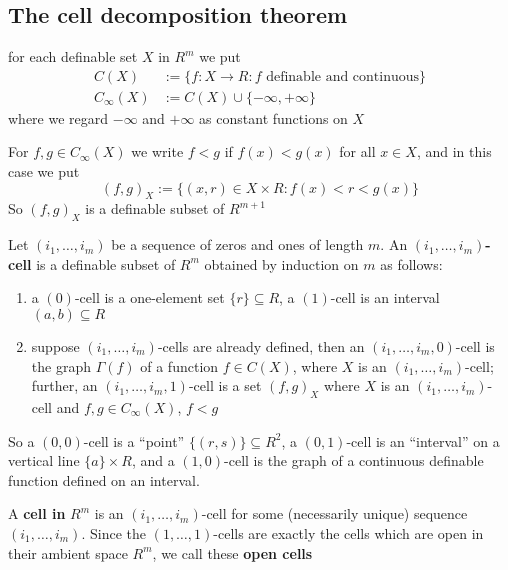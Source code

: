 \documentclass[11pt]{article}
\begin{document}
\subsection{The cell decomposition theorem}
\label{sec:org87b961d}
for each definable set \(X\) in \(R^m\) we put
\begin{align*}
C(X)&:=\{f:X\to R:f\text{ definable and continuous}\}\\
C_\infty(X)&:=C(X)\cup\{-\infty,+\infty\}
\end{align*}
where we regard \(-\infty\) and \(+\infty\) as constant functions on \(X\)

For \(f,g\in C_\infty(X)\) we write \(f<g\) if \(f(x)<g(x)\) for all \(x\in X\), and in this case we put
\begin{equation*}
(f,g)_X:=\{(x,r)\in X\times R:f(x)<r<g(x)\}
\end{equation*}
So \((f,g)_X\) is a definable subset of \(R^{m+1}\)

\begin{definition}[]
Let \((i_1,\dots,i_m)\) be a sequence of zeros and ones of length \(m\). An \textbf{\((i_1,\dots,i_m)\)-cell} is a
definable subset of \(R^m\) obtained by induction on \(m\) as follows:
\begin{enumerate}
\item a \((0)\)-cell is a one-element set \(\{r\}\subseteq R\), a \((1)\)-cell is an
interval \((a,b)\subseteq R\)
\item suppose \((i_1,\dots,i_m)\)-cells are already defined, then an \((i_1,\dots,i_m,0)\)-cell is the
graph \(\Gamma(f)\) of a function \(f\in C(X)\), where \(X\) is an \((i_1,\dots,i_m)\)-cell; further,
an \((i_1,\dots,i_m,1)\)-cell is a set \((f,g)_X\) where \(X\) is an \((i_1,\dots,i_m)\)-cell
and \(f,g\in C_\infty(X)\), \(f<g\)
\end{enumerate}
\end{definition}

So a \((0,0)\)-cell is a ``point'' \(\{(r,s)\}\subseteq R^2\), a \((0,1)\)-cell is an ``interval'' on a
vertical line \(\{a\}\times R\), and a \((1,0)\)-cell is the graph of a continuous definable function
defined on an interval.

\begin{definition}[]
A \textbf{cell in} \(R^m\) is an \((i_1,\dots,i_m)\)-cell for some (necessarily unique)
sequence \((i_1,\dots,i_m)\). Since the \((1,\dots,1)\)-cells are exactly the cells which are open in
their ambient space \(R^m\), we call these \textbf{open cells}
\end{definition}
\end{document}
